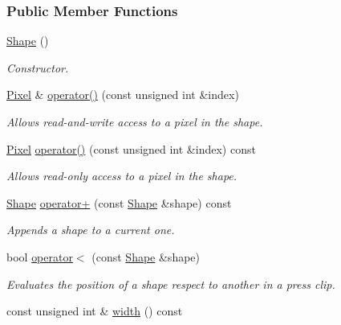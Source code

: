 \subsubsection*{Public Member Functions}
\begin{CompactItemize}
\item 
\hyperlink{class_shape_aa8d87171e65e0d8ba3c5459978992a7}{Shape} ()
\begin{CompactList}\small\item\em Constructor. \item\end{CompactList}\item 
\hyperlink{_shape_8hpp_535e59456e3e633842529cfa8ea103c4}{Pixel} \& \hyperlink{class_shape_7d12f3a76e2bfb7963c00237eba41e0a}{operator()} (const unsigned int \&index)
\begin{CompactList}\small\item\em Allows read-and-write access to a pixel in the shape. \item\end{CompactList}\item 
\hyperlink{_shape_8hpp_535e59456e3e633842529cfa8ea103c4}{Pixel} \hyperlink{class_shape_79caae3047826779e0c8094e9882843b}{operator()} (const unsigned int \&index) const 
\begin{CompactList}\small\item\em Allows read-only access to a pixel in the shape. \item\end{CompactList}\item 
\hyperlink{class_shape}{Shape} \hyperlink{class_shape_4e1517d6e14471df4750bc241f517b4e}{operator+} (const \hyperlink{class_shape}{Shape} \&shape) const 
\begin{CompactList}\small\item\em Appends a shape to a current one. \item\end{CompactList}\item 
bool \hyperlink{class_shape_183a6bc428172ced8122ffb68d0f04ef}{operator$<$} (const \hyperlink{class_shape}{Shape} \&shape)
\begin{CompactList}\small\item\em Evaluates the position of a shape respect to another in a press clip. \item\end{CompactList}\item 
const unsigned int \& \hyperlink{class_shape_6773dfedb96ef750e5469e22d51ecf0f}{width} () const 

\end{CompactItemize}
